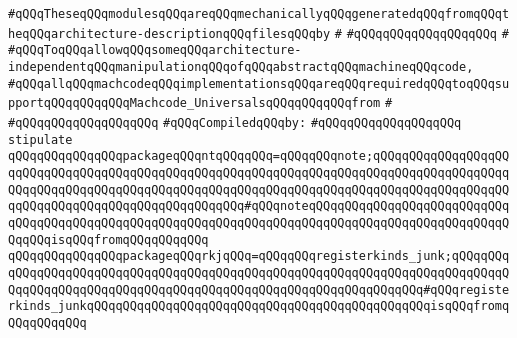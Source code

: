 \verb|#qQQqTheseqQQqmodulesqQQqareqQQqmechanicallyqQQqgeneratedqQQqfromqQQqtheqQQqarchitecture-descriptionqQQqfilesqQQqby|\newline
\verb|#|\newline
\verb|#qQQqqQQqqQQqqQQqqQQq|\newline
\verb|#|\newline
\verb|#qQQqToqQQqallowqQQqsomeqQQqarchitecture-independentqQQqmanipulationqQQqofqQQqabstractqQQqmachineqQQqcode,|\newline
\verb|#qQQqallqQQqmachcodeqQQqimplementationsqQQqareqQQqrequiredqQQqtoqQQqsupportqQQqqQQqqQQqMachcode_UniversalsqQQqqQQqqQQqfrom|\newline
\verb|#|\newline
\verb|#qQQqqQQqqQQqqQQqqQQq|\newline
\newline
\verb|#qQQqCompiledqQQqby:|\newline
\verb|#qQQqqQQqqQQqqQQqqQQq|\newline
\newline
\newline
\newline
\newline
\verb|stipulate|\newline
\verb|qQQqqQQqqQQqqQQqpackageqQQqntqQQqqQQq=qQQqqQQqnote;qQQqqQQqqQQqqQQqqQQqqQQqqQQqqQQqqQQqqQQqqQQqqQQqqQQqqQQqqQQqqQQqqQQqqQQqqQQqqQQqqQQqqQQqqQQqqQQqqQQqqQQqqQQqqQQqqQQqqQQqqQQqqQQqqQQqqQQqqQQqqQQqqQQqqQQqqQQqqQQqqQQqqQQqqQQqqQQqqQQqqQQqqQQqqQQq#qQQqnoteqQQqqQQqqQQqqQQqqQQqqQQqqQQqqQQqqQQqqQQqqQQqqQQqqQQqqQQqqQQqqQQqqQQqqQQqqQQqqQQqqQQqqQQqqQQqqQQqqQQqqQQqisqQQqfromqQQqqQQqqQQq|\newline
\verb|qQQqqQQqqQQqqQQqpackageqQQqrkjqQQq=qQQqqQQqregisterkinds_junk;qQQqqQQqqQQqqQQqqQQqqQQqqQQqqQQqqQQqqQQqqQQqqQQqqQQqqQQqqQQqqQQqqQQqqQQqqQQqqQQqqQQqqQQqqQQqqQQqqQQqqQQqqQQqqQQqqQQqqQQqqQQqqQQqqQQqqQQq#qQQqregisterkinds_junkqQQqqQQqqQQqqQQqqQQqqQQqqQQqqQQqqQQqqQQqqQQqqQQqisqQQqfromqQQqqQQqqQQq|\newline
